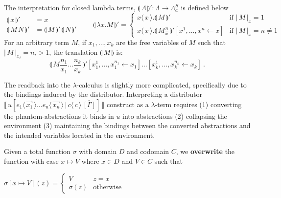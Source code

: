 \documentclass[a4paper,UKenglish,cleveref, autoref]{lipics-v2019}
\newcommand\defn{\textbf}
\newcommand{\FALC}{\Lambda^{S}_{a}}
\newcommand{\abs}[2]{\lambda #1 . #2}
\newcommand{\app}[2]{#1 \, #2}
\newcommand{\fake}[3]{#1 \langle \, #2 \, \rangle . #3}
\newcommand{\share}[3]{#1 [#2 \leftarrow #3]}
\newcommand{\dist}[5]{#1 [ #2 \, \vert \, \fakedist{#4}{#5} \, #3 ]}
\newcommand{\fakedist}[2]{#1 \langle \, #2 \, \rangle}
\newcommand{\size}[1]{\vert \, #1 \, \vert}
\newcommand{\compile}[1]{\llparenthesis \, #1 \, \rrparenthesis}
\newcommand{\trans}[1]{\llbracket \, #1 \, \rrbracket}
\begin{document}
\begin{definition}[Compilation]
\label{def:compile}
The interpretation for closed lambda terms, $\compile{\Lambda}' : \Lambda \rightarrow \FALC$ is defined below
\[
\begin{aligned}
	\compile{x}' &= x \\
	\compile{\app{M}{N}}' &= \app{\compile{M}'}{\compile{N}'}
\end{aligned}
\qquad
	\compile{\abs{x}{M}}' =
	\begin{cases}
		\fake{x}{x}{\compile{M}'} & \text{if } \size{M}_{x} = 1 \\
		\fake{x}{x}{\share{\compile{M \frac{n}{x}}'}{x^{1}, \dots, x^{n}}{x}} & \text{if } \size{M}_{x} = n \neq 1
	\end{cases}
\]
For an arbitrary term $M$, if $x_{1}, \dots, x_{k}$ are the free variables of $M$ such that $\size{M}_{x_{i}} = n_{i} > 1$, the translation $\compile{M}$ is:
\[
\compile{M \frac{n_{1}}{x_{1}} \dots \frac{n_{k}}{x_{k}} }' \share{}{x^{1}_{1}, \dots, x^{n_{1}}_{1}}{x_{1}} \dots \share{}{x^{1}_{k}, \dots, x^{n_{k}}_{k}}{x_{k}}~.
\]
\end{definition}

The readback into the $\lambda$-calculus is slightly more complicated, specifically due to the bindings induced by the distributor. Interpreting a distributor $\trans{\dist{u}{\fakedist{e_{1}}{\vec{x_{1}}} \dots \fakedist{e_{n}}{\vec{x_{n}}}}{\overline{[\Gamma]}}{c}{c}}$ construct as a $\lambda$-term requires (1) converting the phantom-abstractions it binds in $u$ into abstractions (2) collapsing the environment (3) maintaining the bindings between the converted abstractions and the intended variables located in the environment.


\begin{definition}
Given a total function $\sigma$ with domain $D$ and codomain $C$, we \defn{overwrite} the function with case $x \mapsto V$ where $x \in D$ and $V \in C$ such that

$\sigma [ x \mapsto V ] (z) = \begin{cases} V & z = x \\ \sigma(z) & \text{otherwise}  \end{cases}$
\end{definition}
\end{document}
